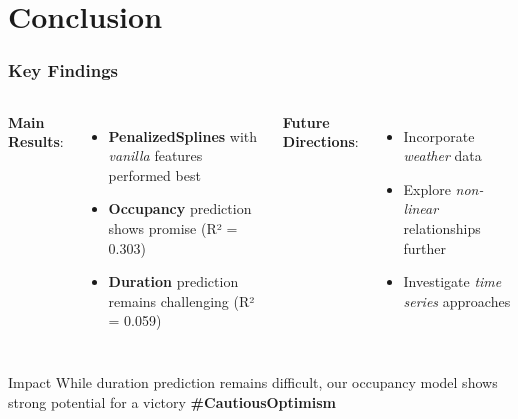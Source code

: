 \documentclass{beamer}
\begin{document}
\section{Conclusion}

\begin{frame}
\frametitle{Key Findings}
    \begin{columns}
        \textbf{Main Results}:
            \begin{itemize}
                \item \textbf{PenalizedSplines} with \textit{vanilla} features performed best
                \item \textbf{Occupancy} prediction shows promise (R² = 0.303)
                \item \textbf{Duration} prediction remains challenging (R² = 0.059)
            \end{itemize}
                            
        \textbf{Future Directions}:
            \begin{itemize}
            \item Incorporate \textit{weather} data
            \item Explore \textit{non-linear} relationships further
            \item Investigate \textit{time series} approaches
            \end{itemize}
    \end{columns}

    \vspace{0.5cm}
    \begin{alertblock}{Impact}
        While duration prediction remains difficult, our occupancy model shows strong potential for a victory \textbf{\#CautiousOptimism}
    \end{alertblock}
\end{frame}
\end{document}
